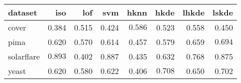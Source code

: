 \begin{tabular}{l|rrr|rrrr}
  \toprule
dataset & iso & lof & svm & hknn & hkde & lhkde & lskde \\ 
  \midrule
cover & 0.384 & 0.515 & 0.424 & $\bm{0.586}$ & 0.523 & 0.558 & 0.450 \\ 
  pima & 0.620 & 0.570 & 0.614 & 0.457 & 0.579 & 0.659 & $\bm{0.694}$ \\ 
  solarflare & $\bm{0.893}$ & 0.402 & 0.887 & 0.435 & 0.632 & 0.768 & 0.875 \\ 
  yeast & 0.620 & 0.580 & 0.622 & 0.406 & $\bm{0.708}$ & 0.650 & 0.702 \\ 
   \bottomrule
\end{tabular}
